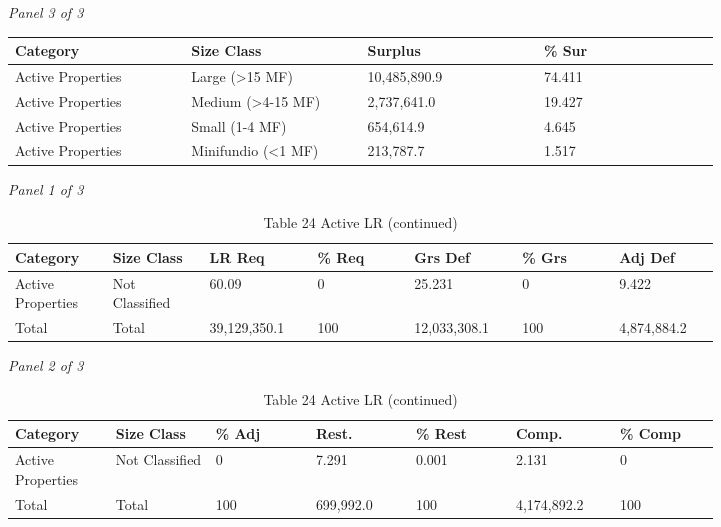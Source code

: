 \documentclass[12pt]{article}
\begin{document}
\begin{landscape}
\begin{table}[H]
\textit{Panel 3 of 3}\\[2pt]
{\fontsize{12}{14}\selectfont
\setlength{\tabcolsep}{3pt}
\renewcommand{\arraystretch}{1.08}
\begin{tabular}{p{0.205\linewidth}p{0.205\linewidth}p{0.205\linewidth}p{0.205\linewidth}}
\toprule
Category & Size Class & Surplus & \% Sur \\
\midrule
Active Properties & Large (>15 MF) & 10,485,890.9 & 74.411 \\
Active Properties & Medium (>4-15 MF) & 2,737,641.0 & 19.427 \\
Active Properties & Small (1-4 MF) & 654,614.9 & 4.645 \\
Active Properties & Minifundio (<1 MF) & 213,787.7 & 1.517 \\
\bottomrule
\end{tabular}
}
\end{table}
\begin{table}[H]
\centering
\caption{Table 24 Active LR (continued)}
\textit{Panel 1 of 3}\\[2pt]
{\fontsize{12}{14}\selectfont
\setlength{\tabcolsep}{3pt}
\renewcommand{\arraystretch}{1.08}
\begin{tabular}{p{0.117\linewidth}p{0.117\linewidth}p{0.117\linewidth}p{0.117\linewidth}p{0.117\linewidth}p{0.117\linewidth}p{0.117\linewidth}}
\toprule
Category & Size Class & LR Req & \% Req & Grs Def & \% Grs & Adj Def \\
\midrule
Active Properties & Not Classified & 60.09 & 0 & 25.231 & 0 & 9.422 \\
Total & Total & 39,129,350.1 & 100 & 12,033,308.1 & 100 & 4,874,884.2 \\
\bottomrule
\end{tabular}
}

\vspace{0.6em}

\textit{Panel 2 of 3}\\[2pt]
{\fontsize{12}{14}\selectfont
\setlength{\tabcolsep}{3pt}
\renewcommand{\arraystretch}{1.08}
\begin{tabular}{p{0.117\linewidth}p{0.117\linewidth}p{0.117\linewidth}p{0.117\linewidth}p{0.117\linewidth}p{0.117\linewidth}p{0.117\linewidth}}
\toprule
Category & Size Class & \% Adj & Rest. & \% Rest & Comp. & \% Comp \\
\midrule
Active Properties & Not Classified & 0 & 7.291 & 0.001 & 2.131 & 0 \\
Total & Total & 100 & 699,992.0 & 100 & 4,174,892.2 & 100 \\
\bottomrule
\end{tabular}
}


\end{table}
\end{landscape}
\end{document}
